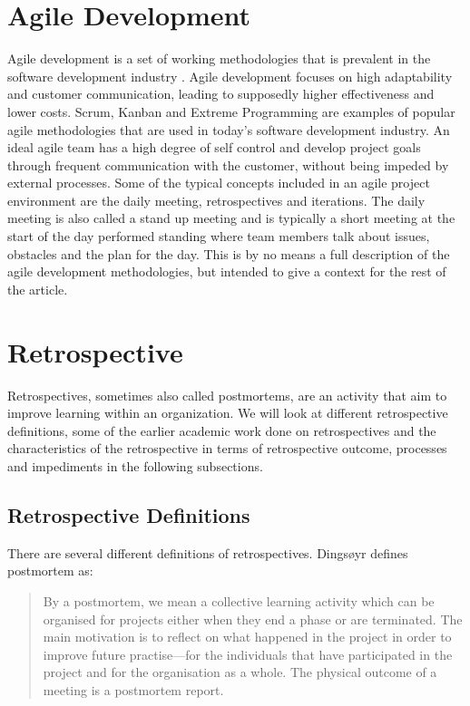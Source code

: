 \section{Agile Development}
Agile development is a set of working methodologies that is prevalent in the software development industry \cite{Tessem2014}. Agile development focuses on high adaptability and customer communication, leading to supposedly higher effectiveness and lower costs. Scrum, Kanban and Extreme Programming are examples of popular agile methodologies that are used in today's software development industry. An ideal agile team has a high degree of self control and develop project goals through frequent communication with the customer, without being impeded by external processes. Some of the typical concepts included in an agile project environment are the daily meeting, retrospectives and iterations. The daily meeting is also called a stand up meeting and is typically a short meeting at the start of the day performed standing where team members talk about issues, obstacles and the plan for the day\cite{Moe2012}. This is by no means a full description of the agile development methodologies, but intended to give a context for the rest of the article.

\section{Retrospective}
Retrospectives, sometimes also called postmortems, are an activity that aim to improve learning within an organization. We will look at different retrospective definitions, some of the earlier academic work done on retrospectives and the characteristics of the retrospective in terms of retrospective outcome, processes and impediments in the following subsections.

\subsection{Retrospective Definitions}
There are several different definitions of retrospectives. Dingsøyr \cite{Dingsoyr2004} defines postmortem as: 

\begin{quote}
By a postmortem, we mean a collective learning activity which
can be organised for projects either when they end a phase or
are terminated. The main motivation is to reflect on what happened
in the project in order to improve future practise—for the
individuals that have participated in the project and for the organisation
as a whole. The physical outcome of a meeting is a postmortem report.
\end{quote}

